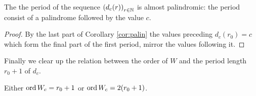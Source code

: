 \begin{theorem}[Observation 5]
  The the period of the sequence $\left(d_{c}(r)\right)_{r\in\mathbb{N}}$
  is almost palindromic: the period consist of a palindrome followed by the value $c$.
\end{theorem}

\begin{proof}
	By the last part of Corollary \ref{cor:palin} the values
	preceding $d_c(r_0)=c$ which form the final part of the first
	period, mirror the values following it.
\end{proof}
%
%
%
%
%
%
%
%
%
%
Finally we clear up the relation between the order of $W$ and the period length $r_0+1$ of $d_c$. 
\begin{lemma}\label{lem:half}
	Either $\operatorname{ord} W_c =r_0+1$ or $\operatorname{ord} W_c=2(r_0+1)$. 
\end{lemma}

